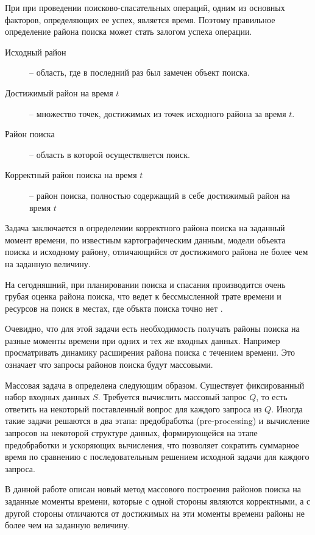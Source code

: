 \startprefacepage

При при проведении поисково-спасательных операций, одним
из основных факторов, определяющих ее успех, является время.
Поэтому правильное определение района поиска может стать залогом
успеха операции.

\begin{description}
\item[Исходный район] -- область, где в последний раз был замечен объект поиска.
\item[Достижимый район на время $t$] -- множество точек, достижимых
из точек исходного района за время $t$.
\item[Район поиска] -- область в которой осуществляется поиск.
\item[Корректный район поиска на время $t$] -- район поиска, полностью
содержащий в себе достижимый район на время $t$
\end{description}

Задача заключается в определении корректного района поиска на заданный
момент времени, по известным картографическим данным, модели
объекта поиска и исходному району, отличающийся от достижимого района
не более чем на заданную величину.


На сегодняшний, при планировании поиска и спасания производится
очень грубая оценка района поиска, что ведет к бессмысленной трате
времени и ресурсов на поиск в местах, где объкта поиска точно нет \cite{SAR}.

Очевидно, что для этой задачи есть необходимость получать
районы поиска на разные моменты времени при одних и тех же
входных данных. Например просматривать динамику расширения района
поиска с течением времени. Это означает что запросы
районов поиска будут массовыми.

Массовая задача в \cite{PrSh} определена следующим образом. Существует
фиксированный набор входных данных $S$. Требуется вычислить массовый
запрос $Q$, то есть ответить на некоторый поставленный вопрос для каждого
запроса из $Q$. Иногда такие задачи решаются в два этапа: предобработка
(pre-processing) и вычисление запросов на некоторой структуре данных,
формирующейся на этапе предобработки и ускоряющих вычисления, что позволяет
сократить суммарное время по сравнению с последовательным решением
исходной задачи для каждого запроса.

В данной работе описан новый метод массового построения районов
поиска на заданные моменты времени, которые с одной стороны являются корректными,
а с другой стороны отличаются от достижимых на эти моменты
времени районы не более чем на заданную величину.

\FloatBarrier
